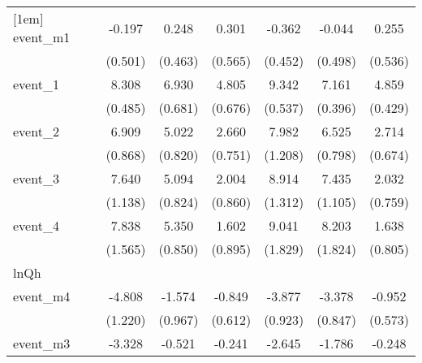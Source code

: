 {\begin{tabular}{l*{6}{c}}
[1em]
event\_m1    &      -0.197         &       0.248         &       0.301         &      -0.362         &      -0.044         &       0.255         \\
            &     (0.501)         &     (0.463)         &     (0.565)         &     (0.452)         &     (0.498)         &     (0.536)         \\
[1em]
event\_1     &       8.308\sym{***}&       6.930\sym{***}&       4.805\sym{***}&       9.342\sym{***}&       7.161\sym{***}&       4.859\sym{***}\\
            &     (0.485)         &     (0.681)         &     (0.676)         &     (0.537)         &     (0.396)         &     (0.429)         \\
[1em]
event\_2     &       6.909\sym{***}&       5.022\sym{***}&       2.660\sym{***}&       7.982\sym{***}&       6.525\sym{***}&       2.714\sym{***}\\
            &     (0.868)         &     (0.820)         &     (0.751)         &     (1.208)         &     (0.798)         &     (0.674)         \\
[1em]
event\_3     &       7.640\sym{***}&       5.094\sym{***}&       2.004\sym{*}  &       8.914\sym{***}&       7.435\sym{***}&       2.032\sym{**} \\
            &     (1.138)         &     (0.824)         &     (0.860)         &     (1.312)         &     (1.105)         &     (0.759)         \\
[1em]
event\_4     &       7.838\sym{***}&       5.350\sym{***}&       1.602         &       9.041\sym{***}&       8.203\sym{***}&       1.638\sym{*}  \\
            &     (1.565)         &     (0.850)         &     (0.895)         &     (1.829)         &     (1.824)         &     (0.805)         \\
\hline
lnQh        &                     &                     &                     &                     &                     &                     \\
event\_m4    &      -4.808\sym{***}&      -1.574         &      -0.849         &      -3.877\sym{***}&      -3.378\sym{***}&      -0.952         \\
            &     (1.220)         &     (0.967)         &     (0.612)         &     (0.923)         &     (0.847)         &     (0.573)         \\
[1em]
event\_m3    &      -3.328\sym{**} &      -0.521         &      -0.241         &      -2.645\sym{*}  &      -1.786\sym{*}  &      -0.248         \\

\end{tabular}}
